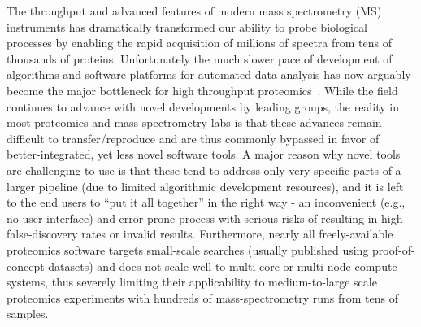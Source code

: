\documentclass[arial,11pt]{article}
\begin{document}
The throughput and advanced features of modern mass spectrometry (MS) instruments has dramatically transformed our ability to probe biological processes by enabling the rapid acquisition of millions of spectra from tens of thousands of proteins. Unfortunately the much slower pace of development of algorithms and software platforms for automated data analysis has now arguably become the major bottleneck for high throughput proteomics~\cite{Bell:2009,Duncan:2010}. While the field continues to advance with novel developments by leading groups, the reality in most proteomics and mass spectrometry labs is that these advances remain difficult to transfer/reproduce and are thus commonly bypassed in favor of better-integrated, yet less novel software tools. A major reason why novel tools are challenging to use is that these tend to address only very specific parts of a larger pipeline (due to limited algorithmic development resources), and it is left to the end users to ``put it all together'' in the right way - an inconvenient (e.g., no user interface) and error-prone process with serious risks of resulting in high false-discovery rates or invalid results. Furthermore, nearly all freely-available proteomics software targets small-scale searches (usually published using proof-of-concept datasets) and does not scale well to multi-core or multi-node compute systems, thus severely limiting their applicability to medium-to-large scale proteomics experiments with hundreds of mass-spectrometry runs from tens of samples.
\end{document}
